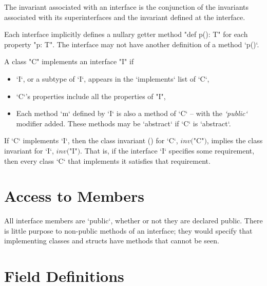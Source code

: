 \noindent
The invariant associated with an interface is the conjunction of the
invariants associated with its superinterfaces and the invariant
defined at the interface. 


Each interface implicitly defines a nullary getter method
\xcd"def p(): T" for each property \xcd"p: T". The interface may not have
another definition of a method \xcd`p()`. 



A class \xcd"C"  implements an interface \xcd"I" if
\begin{itemize}
\item \xcd`I`, or a subtype of \xcd`I`, appears in the \xcd`implements` list
      of \xcd`C`, 
\item \xcd`C`'s properties include all the properties of \xcd"I",
\item Each method \xcd`m` defined by \xcd`I` is also a method of \xcd`C` --
      with the {\em  \xcd`public`} modifier added.   These methods may be
      \xcd`abstract` if \xcd`C` is \xcd`abstract`.
\end{itemize}


If \xcd`C` implements \xcd`I`, then the class invariant
() for \xcd`C`,   $\mathit{inv}($\xcd"C"$)$, implies
the class invariant for \xcd`I`, $\mathit{inv}($\xcd"I"$)$.  That is, if the
interface \xcd`I` specifies some requirement, then every class \xcd`C` that
implements it satisfies that requirement.

\section{Access to Members}

All interface members are \xcd`public`, whether or not they are declared
public.  There is little purpose to non-public methods of an interface; they
would specify that implementing classes and structs have methods that cannot
be seen.

\section{Field Definitions}

